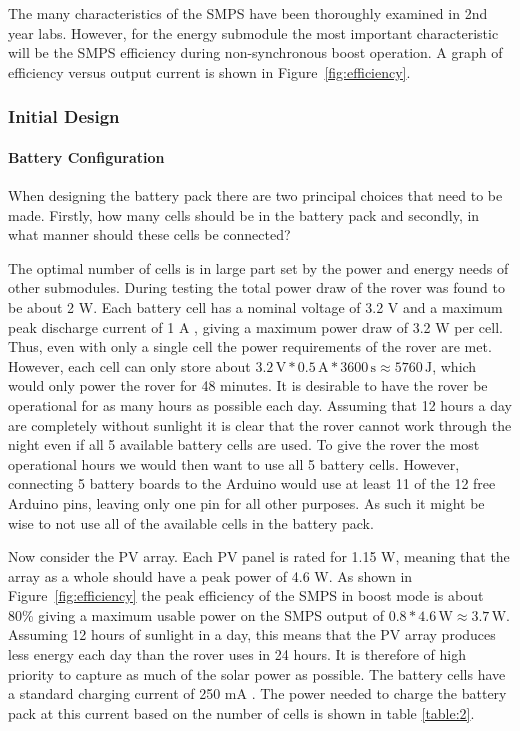 \documentclass[a4paper]{article}
\newcommand{\unit}[1]{\ensuremath{\, \mathrm{#1}}}
\begin{document}
The many characteristics of the SMPS have been thoroughly examined in 
2nd year labs. However, for the energy submodule the most important 
characteristic will be the SMPS efficiency during non-synchronous 
boost operation. A graph of efficiency versus output current is shown 
in Figure~\ref{fig:efficiency}.

\subsubsection{Initial Design}

\paragraph*{Battery Configuration}
When designing the battery pack there are two principal choices that need to be 
made. Firstly, how many cells should be in the battery pack and secondly, in 
what manner should these cells be connected? 

The optimal number of cells is in large part set by the power and energy 
needs of other submodules. During testing the total power draw of the 
rover was found to be about 2 W. Each battery cell has a nominal voltage 
of 3.2 V and a maximum peak discharge current of 1 A \cite{batteryDatasheet}, 
giving a maximum power draw of 3.2 W per cell. Thus, even with only a 
single cell the power requirements of the rover are met. However, each 
cell can only store about 
\(3.2 \unit{V} * 0.5 \unit{A} * 3600 \unit{s} \approx 5760 \unit{J} \),  
which would only power the rover for 48 minutes. It is desirable to 
have the rover be operational for as many hours as possible each day. 
Assuming that 12 hours a day are completely without sunlight it is 
clear that the rover cannot work through the night even if all 
5 available battery cells are used. To give the rover the most 
operational hours we would then want to use all 5 battery cells. 
However, connecting 5 battery boards to the Arduino would use at 
least 11 of the 12 free Arduino pins, leaving only one pin for 
all other purposes. As such it might be wise to not use all of the 
available cells in the battery pack.

Now consider the PV array. Each PV panel is rated for 1.15 W, meaning that 
the array as a whole should have a peak power of 4.6 W. As shown in 
Figure~\ref{fig:efficiency} the peak efficiency of the SMPS in boost mode 
is about 80\% giving a maximum usable power on the SMPS output of 
\(0.8 * 4.6 \unit{W} \approx 3.7 \unit{W} \). Assuming 12 hours of 
sunlight in a day, this means that the PV array produces less energy 
each day than the rover uses in 24 hours. It is therefore of high 
priority to capture as much of the solar power as possible. The 
battery cells have a standard charging current of  250 mA 
\cite{batteryDatasheet}. The power needed to charge the battery 
pack at this current based on the number of cells is shown in 
table \ref{table:2}. 
\end{document}
